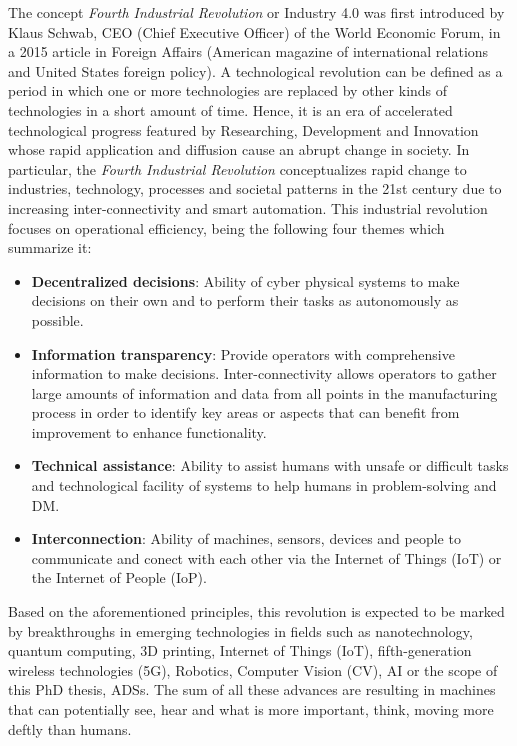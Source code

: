 The concept \textit{Fourth Industrial Revolution} or Industry 4.0  was first introduced by Klaus Schwab, CEO (Chief Executive Officer) of the World Economic Forum, in a 2015 article in Foreign Affairs (American magazine of international relations and United States foreign policy). A technological revolution can be defined as a period in which one or more technologies are replaced by other kinds of technologies in a short amount of time. Hence, it is an era of accelerated technological progress featured by Researching, Development and Innovation whose rapid application and diffusion cause an abrupt change in society. In particular, the \textit{Fourth Industrial Revolution} conceptualizes rapid change to industries, technology, processes and societal patterns in the 21st century due to increasing inter-connectivity and smart automation. This industrial revolution focuses on operational efficiency, being the following four themes which summarize it: 

\begin{itemize}
	
	\item \textbf{Decentralized decisions}: Ability of cyber physical systems to make decisions on their own and to perform their tasks as autonomously as possible.
	
	\item \textbf{Information transparency}: Provide operators with comprehensive information to make decisions. Inter-connectivity allows operators to gather large amounts of information and data from all points in the manufacturing process in order to identify key areas or aspects that can benefit from improvement to enhance functionality.
	
	\item \textbf{Technical assistance}: Ability to assist humans with unsafe or difficult tasks and technological facility of systems to help humans in problem-solving and \ac{DM}.
	
	\item \textbf{Interconnection}: Ability of machines, sensors, devices and people to communicate and conect with each other via the Internet of Things (IoT) or the Internet of People (IoP).
	
\end{itemize}

Based on the aforementioned principles, this revolution is expected to be marked by breakthroughs in emerging technologies in fields such as nanotechnology, quantum computing, 3D printing, Internet of Things (IoT), fifth-generation wireless technologies (5G), Robotics, Computer Vision (CV), \ac{AI} or the scope of this PhD thesis, \acp{ADS}. The sum of all these advances are resulting in machines that can potentially see, hear and what is more important, think, moving more deftly than humans. 

